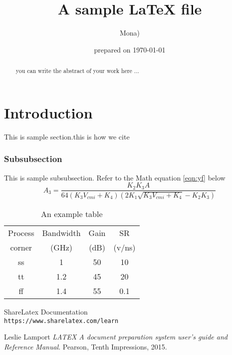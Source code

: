 \documentclass[onecolumn,12pt]{article}
\begin{document}
\title{A sample LaTeX file}
\author{ Mona)}
\date{ prepared on \today}

\maketitle

\begin{abstract}
you can write the abstract of your work here ... 
\end{abstract}



\listoftables
\listoffigures

\newpage

\section{Introduction}
This is sample section.\newline this is how we cite\cite{LatexLearn}
\subsubsection{Subsubsection}
This is sample subsubsection.
\newline Refer to the Math equation \ref{eqn:yf} below
\begin{equation}
{A_3 = \frac{K_2 K_3 A}{64(K_3 V_{cmi}+K_4)(2K_1\sqrt{K_3 V_{cmi}+K_4}-K_2 K_3)}}
\label{eqn:yf}
\end{equation}




\begin{table}[h]
	\centering
	\caption{ An example table}
	\label{table:bwg}
\begin{tabular}{|c|c|c|c|}
	\hline
	Process & Bandwidth & Gain & SR\\
	corner & (GHz) & (dB) & (v/ns)\\
	\hline
	ss & 1 & 50 & 10 \\
	\hline
	tt & 1.2 & 45 & 20 \\
	\hline
	ff & 1.4 & 55 & 0.1 \\
	\hline
\end{tabular}

\end{table}




\begin{thebibliography}{9}

	ShareLatex Documentation
	\\\texttt{https://www.sharelatex.com/learn}
	
Leslie Lamport 
\textit{LATEX A document preparation system user's guide and Reference Manual}. 
Pearson, Tenth Impressions, 2015.


	
\end{thebibliography}
\end{document}
